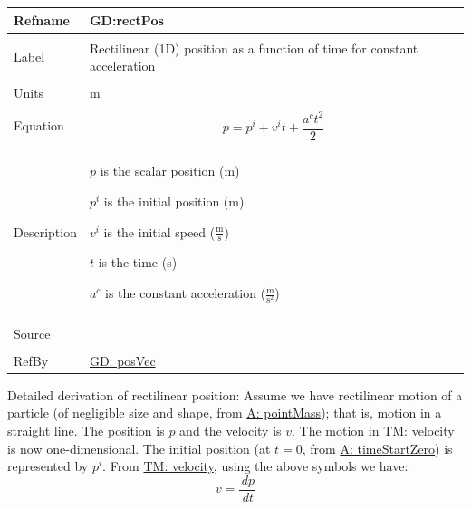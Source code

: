 \documentclass[12pt]{article}
\begin{document}
\noindent \begin{minipage}{\textwidth}
\begin{tabular}{>{\raggedright}p{}>{\raggedright\arraybackslash}p{}}
\toprule \textbf{Refname} & \textbf{GD:rectPos}
\label{GD:rectPos}
\\ \midrule \\
Label & Rectilinear (1D) position as a function of time for constant acceleration
\\ \midrule \\
Units & m
\\ \midrule \\
Equation & \begin{displaymath}
           p={p^{i}}+{v^{i}} t+\frac{{a^{c}} t^{2}}{2}
           \end{displaymath}
\\ \midrule \\
Description & \begin{symbDescription}
              \item{$p$ is the scalar position (m)}
              \item{${p^{i}}$ is the initial position (m)}
              \item{${v^{i}}$ is the initial speed ($\frac{\text{m}}{\text{s}}$)}
              \item{$t$ is the time (s)}
              \item{${a^{c}}$ is the constant acceleration ($\frac{\text{m}}{\text{s}^{2}}$)}
              \end{symbDescription}
\\ \midrule \\
Source & \cite[(pg. 8)]{hibbeler2004}
\\ \midrule \\
RefBy & \hyperref[GD:posVec]{GD: posVec}
\\ \bottomrule
\end{tabular}
\end{minipage}
Detailed derivation of rectilinear position:
Assume we have rectilinear motion of a particle (of negligible size and shape, from \hyperref[pointMass]{A: pointMass}); that is, motion in a straight line. The position is $p$ and the velocity is $v$. The motion in \hyperref[TM:velocity]{TM: velocity} is now one-dimensional. The initial position (at $t=0$, from \hyperref[timeStartZero]{A: timeStartZero}) is represented by ${p^{i}}$. From \hyperref[TM:velocity]{TM: velocity}, using the above symbols we have:
\begin{displaymath}
v=\frac{\,dp}{\,dt}
\end{displaymath}
\end{document}
